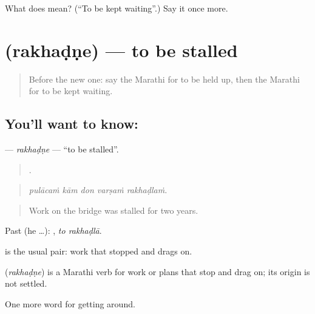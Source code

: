 \begin{tcolorbox}[breakable,colback=teal!4,colframe=teal!35!black,title={Before you move on}]
What does  mean? (\textquotedblleft{}To be kept waiting\textquotedblright{}.) Say it once more.
\end{tcolorbox}
\section[\texorpdfstring{\mr{रखडणे} (rakhaḍṇe)}{रखडणे (rakhaḍṇe)}]{ (rakhaḍṇe) — to be stalled}

\label{lesson:MR-C397-rakhadne}



\begin{quote}
Before the new one: say the Marathi for to be held up, then the Marathi for to be kept waiting.
\end{quote}

\subsection*{You'll want to know: }
\textbf{} — \emph{rakhaḍṇe} — \textquotedblleft{}to be stalled\textquotedblright{}.

\begin{quote}
    .
\end{quote}

\begin{quote}
\emph{pulācaṁ kām don varṣaṁ rakhaḍlaṁ.}
\end{quote}

\begin{quote}
Work on the bridge was stalled for two years.
\end{quote}

Past (he …):  , \emph{to rakhaḍlā}.

  is the usual pair: work that stopped and drags on.

\begin{cousinweb}
\textbf{} (\emph{rakhaḍṇe}) is a Marathi verb for work or plans that stop and drag on; its origin is not settled.
\end{cousinweb}

\begin{grammarlens}[title={What you've built}]
One more word for getting around.
\end{grammarlens}

